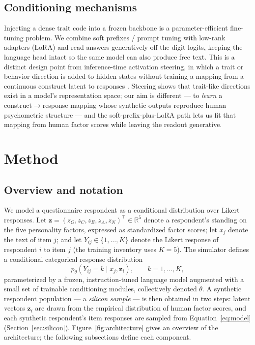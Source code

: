 \documentclass[11pt]{article}
\begin{document}
\subsection{Conditioning mechanisms}

Injecting a dense trait code into a frozen backbone is a parameter-efficient fine-tuning problem. We combine soft prefixes / prompt tuning \citep{lester2021} with low-rank adapters (LoRA) \citep{hu2021} and read answers generatively off the digit logits, keeping the language head intact so the same model can also produce free text. This is a distinct design point from inference-time activation steering, in which a trait or behavior direction is added to hidden states without training a mapping from a continuous construct latent to responses \citep{zou2023}. Steering shows that trait-like directions exist in a model's representation space; our aim is different — to \textit{learn} a construct$\rightarrow$response mapping whose synthetic outputs reproduce human psychometric structure — and the soft-prefix-plus-LoRA path lets us fit that mapping from human factor scores while leaving the readout generative.


\section{Method}
\label{sec:method}

\subsection{Overview and notation}
\label{sec:overview}

We model a questionnaire respondent as a conditional distribution over Likert responses. Let $\mathbf{z} = (z_O, z_C, z_E, z_A, z_N)^\top \in \mathbb{R}^5$ denote a respondent's standing on the five personality factors, expressed as standardized factor scores; let $x_j$ denote the text of item $j$; and let $Y_{ij} \in \{1, \dots, K\}$ denote the Likert response of respondent $i$ to item $j$ (the training inventory uses $K = 5$). The simulator defines a conditional categorical response distribution
\begin{equation}
p_\theta\!\left(Y_{ij} = k \mid x_j, \mathbf{z}_i\right), \qquad k = 1, \dots, K,
\label{eq:model}
\end{equation}
parameterized by a frozen, instruction-tuned language model augmented with a small set of trainable conditioning modules, collectively denoted $\theta$. A synthetic respondent population --- a \textit{silicon sample} --- is then obtained in two steps: latent vectors $\mathbf{z}_i$ are drawn from the empirical distribution of human factor scores, and each synthetic respondent's item responses are sampled from Equation~\ref{eq:model} (Section~\ref{sec:silicon}). Figure~\ref{fig:architecture} gives an overview of the architecture; the following subsections define each component.
\end{document}
